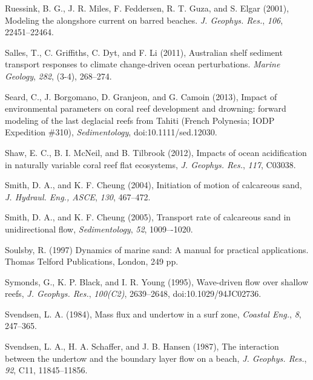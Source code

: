 \documentclass[default,jgrga]{agutex2015}
\begin{document}
\begin{article}
\begin{thebibliography}{}
Ruessink, B. G., J. R. Miles, F. Feddersen, R. T. Guza, and S. Elgar (2001), Modeling the alongshore current on barred beaches.  \textit{J. Geophys. Res.}, \textit{106}, 22451--22464.

Salles, T., C. Griffiths, C. Dyt, and F. Li (2011), Australian shelf sediment transport responses to climate change-driven ocean perturbations. \textit{Marine Geology}, \textit{282}, (3-4), 268--274.

Seard, C., J. Borgomano, D. Granjeon, and G. Camoin (2013), Impact of environmental parameters on coral reef development and drowning: forward modeling of the last deglacial reefs from Tahiti (French Polynesia; IODP Expedition \#310), \textit{Sedimentology}, doi:10.1111/sed.12030.

Shaw, E. C., B. I. McNeil, and B. Tilbrook (2012), Impacts of ocean acidification in naturally variable coral reef flat ecosystems, \textit{J. Geophys. Res.}, \textit{117}, C03038.

Smith, D. A., and K. F. Cheung (2004), Initiation of motion of calcareous sand, \textit{J. Hydraul. Eng., ASCE}, \textit{130}, 467--472.

Smith, D. A., and K. F. Cheung (2005), Transport rate of calcareous sand in unidirectional flow, \textit{Sedimentology}, \textit{52}, 1009–-1020.

Soulsby, R. (1997) Dynamics of marine sand: A manual for practical applications. Thomas Telford Publications, London, 249 pp.

Symonds, G., K. P. Black, and I. R. Young (1995), Wave-driven flow over shallow reefs, \textit{J. Geophys. Res.}, \textit{100(C2)}, 2639--2648, doi:10.1029/94JC02736.

Svendsen, L. A. (1984), Mass flux and undertow in a surf zone, \textit{Coastal Eng.}, \textit{8}, 247--365.

Svendsen, L. A., H. A. Schaffer, and J. B. Hansen (1987), The interaction between the undertow and the boundary layer flow on a beach, \textit{J. Geophys. Res.}, \textit{92}, C11, 11845--11856.


\end{thebibliography}
\end{article}
\end{document}
